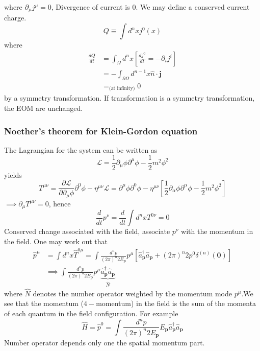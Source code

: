 where $\partial_\mu j^\mu = 0$,  Divergence of current is $0$. We may define a conserved current charge.
\begin{equation}
    Q \equiv \int d^n x j^{0}(x)
\end{equation}
where
\begin{align}
    \frac{dQ}{dt} & = \int_{\Omega} d^n x \left[ \frac{dj^0}{dt}  = -\partial_i j^i  \right] \nonumber\\
    & = -\int_{\partial \Omega } d^{n-1} x \hat{n} \cdot \bm{j} \nonumber\\
    & =_{\text{(at infinity)}} 0
\end{align}
by a symmetry transformation. If transformation is a symmetry transformation, the EOM are unchanged.

\subsubsection{Noether's theorem for Klein-Gordon equation}
The Lagrangian for the system can be written as
\begin{equation}
    \mathcal{L} = \frac{1}{2} \partial_\mu \phi \partial^\mu \phi - \frac{1}{2} m^2 \phi^2
\end{equation}
yields
\begin{equation}
    T^{\mu \nu} = \frac{\partial \mathcal{L}}{\partial \partial_{\mu} \phi } \partial^0 \phi  - \eta^{\mu \nu} \mathcal{L}  = \partial^\mu \phi \partial^0 \phi - \eta^{\mu \nu}  \left[ \frac{1}{2} \partial_{\alpha} \phi \partial^\alpha \phi - \frac{1}{2} m^2 \phi^2   \right]
\end{equation}
$\implies \partial_{\mu}T^{\mu \nu} = 0$, hence
\begin{equation}
    \frac{d}{dt} p^\nu = \frac{d}{dt} \int d^n x T^{0\nu}  = 0
\end{equation}
Conserved change associated with the field, associate $p^\nu$ with the momentum in the field. One may work out that
\begin{align}
    \hat{p}^{\mu} & = \int d^n x \hat{T}^{0 \mu} = \int \frac{d^n p}{(2\pi)^n 2E_{\bm{p}}} p^\mu \left[ \hat{a}^{\dagger}_{\bm{p}} \hat{a}_{\bm{p}} + (2\pi)^n 2p^0 \delta^{(n)} (\bm{0}) \right] \nonumber\\
    & \implies \int \frac{d^n p}{(2\pi)^n 2E_{\bm{p}}} p^\mu  \underbrace{\hat{a}^{\dagger}_{\bm{p}} \hat{a}_{\bm{p}} }_\text{$\hat{N}$}
\end{align}
where $\hat{N}$ denotes the number operator weighted by the momentum mode $p^\mu$.We see that the momentum ($4-$momentum) in the field is the sum of the momenta of each quantum in the field configuration. For example
\begin{equation}
    \hat{H} = \hat{p}^0 =  \int \frac{d^n p}{(2\pi)^n 2E_{\bm{p}}} E_{\bm{p}}  \hat{a}^{\dagger}_{\bm{p}} \hat{a}_{\bm{p}}
\end{equation}
Number operator depends only one the spatial momentum part.

